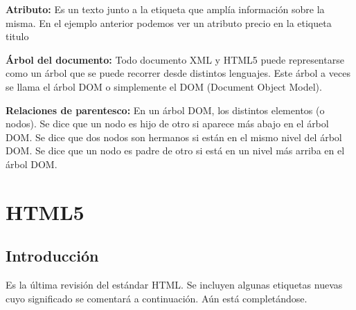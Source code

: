 \documentclass[letterpaper,10pt,spanish]{sphinxmanual}
\begin{document}
\textbf{Atributo:} Es un texto junto a la etiqueta que amplía información sobre la misma. En el ejemplo
anterior podemos ver un atributo precio en la etiqueta titulo

\textbf{Árbol del documento:} Todo documento XML y HTML5 puede representarse como un árbol
que se puede recorrer desde distintos lenguajes. Este árbol a veces se llama el árbol DOM
o simplemente el DOM (Document Object Model).

\textbf{Relaciones de parentesco:} En un árbol DOM, los distintos elementos (o nodos). Se dice que
un nodo es hijo de otro si aparece más abajo en el árbol DOM. Se dice que dos nodos
son hermanos si están en el mismo nivel del árbol DOM. Se dice que un nodo es padre
de otro si está en un nivel más arriba en el árbol DOM.


\chapter{HTML5}
\label{tema2:html5}\label{tema2::doc}

\section{Introducción}
\label{tema2:introduccion}
Es la última revisión del estándar HTML. Se incluyen algunas etiquetas nuevas cuyo significado
se comentará a continuación. Aún está completándose.
\end{document}
